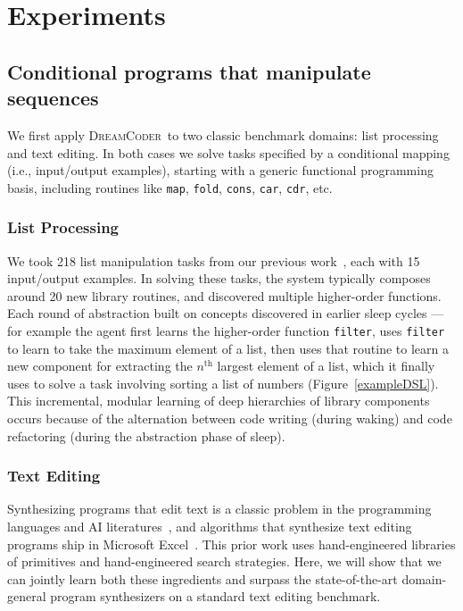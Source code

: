 \documentclass{article}
\newcommand{\system}{\textsc{DreamCoder}~}
\newcommand{\code}[1]{{\footnotesize\texttt{#1}}}
\begin{document}
\section{Experiments}

\subsection{Conditional programs that manipulate sequences}\label{sequences}
We first apply \system to two classic benchmark domains: list
processing and text editing. In both cases we solve tasks specified by
a conditional mapping (i.e., input/output examples), starting with a
generic functional programming basis, including routines like
\code{map}, \code{fold}, \code{cons}, \code{car}, \code{cdr}, etc.

\subsubsection{List Processing}\label{listSection}
We took 218 list manipulation tasks from our previous work~\cite{ecc},
each with 15 input/output examples.  In solving these tasks, the
system typically composes around 20 new library routines, and discovered multiple
higher-order functions. Each round of abstraction built on
concepts discovered in earlier sleep cycles --- for example the
agent first learns the higher-order function \code{filter}, uses
\code{filter} to learn to take the maximum element of a list, then
uses that routine to learn a new component for extracting the
$n^{\text{th}}$ largest element of a list, which it finally uses to
solve a task involving sorting a list of numbers (Figure~\ref{exampleDSL}).
This incremental, modular learning of deep hierarchies of library
components occurs because of the alternation between code writing
(during waking) and code refactoring (during the abstraction phase
of sleep).

\subsubsection{Text Editing}\label{textSection}
Synthesizing programs that edit text is a classic problem in the
programming languages and AI literatures~\cite{lau2001programming},
and algorithms that synthesize text editing programs ship in Microsoft
Excel~\cite{gulwani2011automatin}.  This prior work uses
hand-engineered libraries of primitives and hand-engineered search strategies.  Here, we
will show that we can jointly learn both these ingredients and surpass
the state-of-the-art domain-general program synthesizers on a standard
text editing benchmark.
\end{document}
